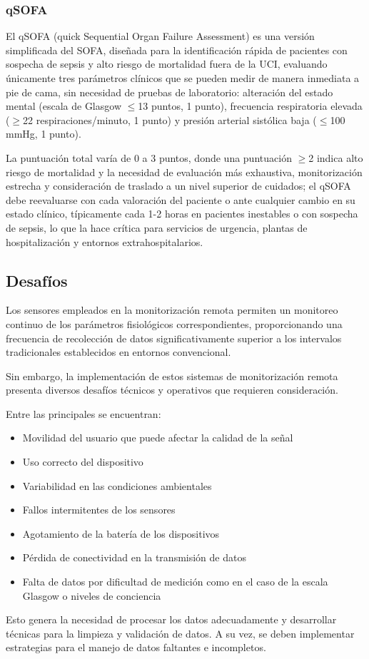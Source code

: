 \newpage
\subsubsection{qSOFA}
El qSOFA (quick Sequential Organ Failure Assessment) es una versión simplificada del SOFA, diseñada para la identificación rápida de pacientes con sospecha de sepsis y alto riesgo de mortalidad fuera de la UCI, 
evaluando únicamente tres parámetros clínicos que se pueden medir de manera inmediata a pie de cama, sin necesidad de pruebas de laboratorio: 
alteración del estado mental (escala de Glasgow $\leq$13 puntos, 1 punto), frecuencia respiratoria elevada ($\geq$22 respiraciones/minuto, 1 punto) y presión arterial sistólica baja ($\leq$100 mmHg, 1 punto).\newline

La puntuación total varía de 0 a 3 puntos, donde una puntuación $\geq$2 indica alto riesgo de mortalidad y la necesidad de evaluación más exhaustiva, monitorización estrecha
y consideración de traslado a un nivel superior de cuidados; el qSOFA debe reevaluarse con cada valoración del paciente o ante cualquier cambio en su estado clínico, 
típicamente cada 1-2 horas en pacientes inestables o con sospecha de sepsis, lo que la hace crítica para servicios de urgencia, plantas de hospitalización y entornos extrahospitalarios.

\newpage

\subsection{Desafíos}

Los sensores empleados en la monitorización remota permiten un monitoreo continuo de los parámetros fisiológicos correspondientes, 
proporcionando una frecuencia de recolección de datos significativamente superior a los intervalos tradicionales establecidos en entornos convencional. \newline

Sin embargo, la implementación de estos sistemas de monitorización remota presenta diversos desafíos técnicos y operativos que requieren consideración. \newline

Entre las principales se encuentran:

\begin{itemize}
    \item Movilidad del usuario que puede afectar la calidad de la señal
    \item Uso correcto del dispositivo
    \item Variabilidad en las condiciones ambientales
    \item Fallos intermitentes de los sensores
    \item Agotamiento de la batería de los dispositivos
    \item Pérdida de conectividad en la transmisión de datos
    \item Falta de datos por dificultad de medición como en el caso de la escala Glasgow o niveles de conciencia
\end{itemize}

Esto genera la necesidad de procesar los datos adecuadamente y desarrollar técnicas para la limpieza y validación de datos.
A su vez, se deben implementar estrategias para el manejo de datos faltantes e incompletos. \parencite{rpm_pm}
